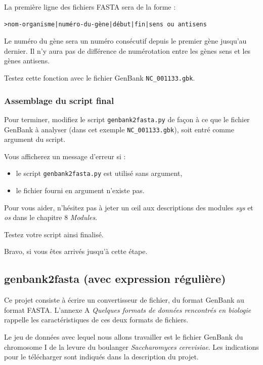 \documentclass[a4paper,11pt,twoside]{book}
\providecommand{\tightlist}{%
  \setlength{\itemsep}{0pt}\setlength{\parskip}{0pt}}
\begin{document}
La première ligne des fichiers FASTA sera de la forme :

\begin{verbatim}
>nom-organisme|numéro-du-gène|début|fin|sens ou antisens
\end{verbatim}

Le numéro du gène sera un numéro consécutif depuis le premier gène
jusqu'au dernier. Il n'y aura pas de différence de numérotation entre
les gènes sens et les gènes antisens.

Testez cette fonction avec le fichier GenBank \texttt{NC\_001133.gbk}.

\subsubsection{Assemblage du script
final}\label{assemblage-du-script-final}

Pour terminer, modifiez le script \texttt{genbank2fasta.py} de façon à
ce que le fichier GenBank à analyser (dans cet exemple
\texttt{NC\_001133.gbk}), soit entré comme argument du script.

Vous afficherez un message d'erreur si :

\begin{itemize}
\tightlist
\item
  le script \texttt{genbank2fasta.py} est utilisé sans argument,
\item
  le fichier fourni en argument n'existe pas.
\end{itemize}

Pour vous aider, n'hésitez pas à jeter un œil aux descriptions des
modules \emph{sys} et \emph{os} dans le chapitre 8 \emph{Modules}.

Testez votre script ainsi finalisé.

Bravo, si vous êtes arrivés jusqu'à cette étape.

\subsection{genbank2fasta (avec expression
régulière)}\label{genbank2fasta-avec-expression-ruxe9guliuxe8re}

Ce projet consiste à écrire un convertisseur de fichier, du format
GenBank au format FASTA. L'annexe A \emph{Quelques formats de données
rencontrés en biologie} rappelle les caractéristiques de ces deux
formats de fichiers.

Le jeu de données avec lequel nous allons travailler est le fichier
GenBank du chromosome I de la levure du boulanger \emph{Saccharomyces
cerevisiae}. Les indications pour le télécharger sont indiqués dans la
description du projet.
\end{document}
